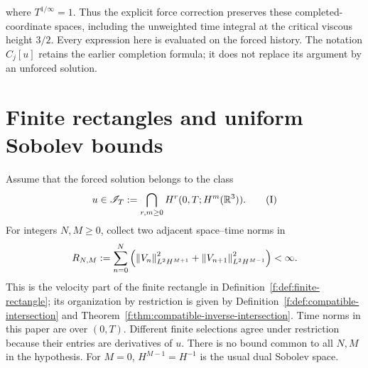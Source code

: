 where \(T^{1/\infty}=1\). Thus the explicit force correction preserves
these completed-coordinate spaces, including the unweighted time integral
at the critical viscous height \(3/2\). Every expression here is evaluated
on the forced history. The notation \(\widehat C_j[u]\) retains the earlier
completion formula; it does not replace its argument by an unforced
solution.

\section{Finite rectangles and uniform Sobolev bounds}\label{r:sec:rectangles}

Assume that the forced solution belongs to the class
\begin{equation*}
 u\in\mathscr I_T:=\bigcap_{r,m\ge0}H^r(0,T;H^m(\mathbb R^3)).
 \tag{I}\label{r:eq:I}
\end{equation*}
For integers \(N,M\ge0\), collect two adjacent space--time norms in
\begin{equation}
 R_{N,M}:=\sum_{n=0}^N
 \left(\left\lVert V_n\right\rVert_{L^2H^{M+1}}^2+
 \left\lVert V_{n+1}\right\rVert_{L^2H^{M-1}}^2\right)<\infty.
\label{r:eq:rectangle}
\end{equation}
This is the velocity part of the finite rectangle in
Definition~\ref{f:def:finite-rectangle}; its organization by restriction is
given by Definition~\ref{f:def:compatible-intersection} and
Theorem~\ref{f:thm:compatible-inverse-intersection}.
Time norms in this paper are over \((0,T)\). Different finite selections
agree under restriction because their entries are derivatives of \(u\).
There is no bound common to all \(N,M\) in the hypothesis.
For \(M=0\), \(H^{M-1}=H^{-1}\) is the usual dual Sobolev space.

